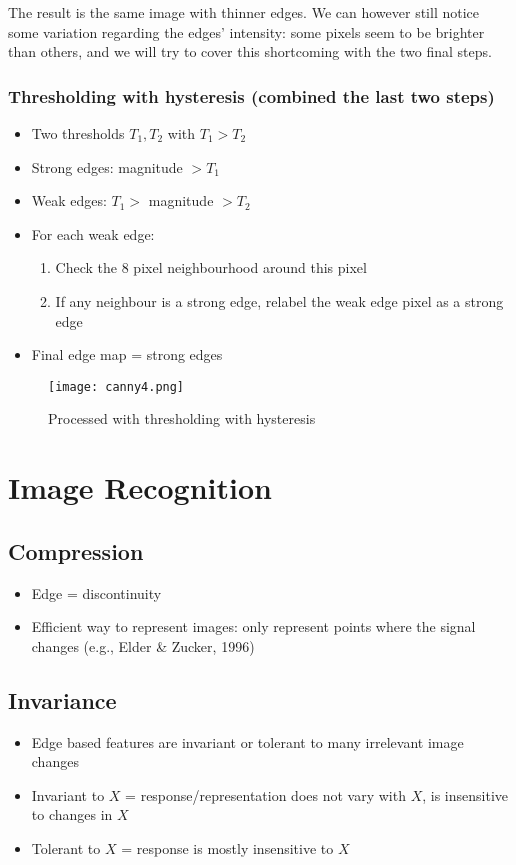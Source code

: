 \documentclass[11pt]{article}
\begin{document}
The result is the same image with thinner edges. We can however still notice some variation regarding the edges’ intensity: some pixels seem to be brighter than others, and we will try to cover this shortcoming with the two final steps.


\subsubsection{Thresholding with hysteresis (combined the last two steps)}
\begin{itemize}
    \item Two thresholds $T_1, T_2$ with $T_1 > T_2$
    \item Strong edges: magnitude $> T_1$
    \item Weak edges: $T_1 >$ magnitude $> T_2$
    \item For each weak edge:
          \begin{enumerate}
              \item Check the 8 pixel neighbourhood around this pixel
              \item If any neighbour is a strong edge, relabel the weak edge
                    pixel as a strong edge
          \end{enumerate}
    \item Final edge map = strong edges
\end{itemize}

\begin{figure}[hbt!]
    \centering
    \texttt{[image: canny4.png]}
    \caption{Processed with thresholding with hysteresis}
\end{figure}


\section{Image Recognition}
\subsection{Compression}
\begin{itemize}
    \item Edge = discontinuity
    \item Efficient way to represent images: only represent points
          where the signal changes (e.g., Elder \& Zucker, 1996)
\end{itemize}

\subsection{Invariance}
\begin{itemize}
    \item Edge based features are invariant or tolerant to many
          irrelevant image changes
    \item Invariant to $X$ = response/representation does not
          vary with $X$, is insensitive to changes in $X$
    \item Tolerant to $X$ = response is mostly insensitive to $X$
\end{itemize}
\end{document}
